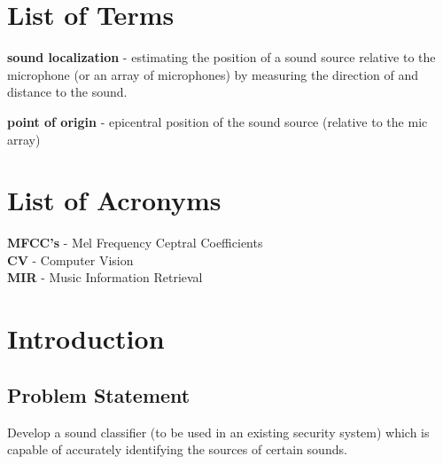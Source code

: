 \documentclass[a4paper,12pt]{article}
\numberwithin{equation}{section}
\numberwithin{figure}{section}
\numberwithin{table}{section}
\begin{document}
\section*{List of Terms}
\textbf{sound localization} - estimating the position of a sound source relative to the microphone (or an array of microphones) by measuring the direction of and distance to the sound.

\textbf{point of origin} - epicentral position of the sound source (relative to the mic array)

\section*{List of Acronyms}
\textbf{MFCC's} - Mel Frequency Ceptral Coefficients\\
\textbf{CV} - Computer Vision\\
\textbf{MIR} - Music Information Retrieval\\































\newpage
{}







\section{Introduction}

\subsection{Problem Statement}
Develop a sound classifier (to be used in an existing security system) which is capable of accurately identifying the sources of certain sounds.
\end{document}
